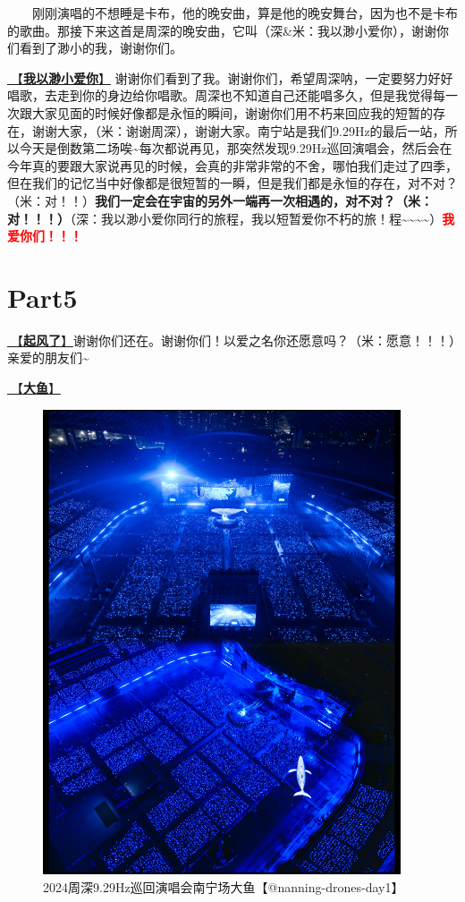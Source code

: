 \documentclass[]{ctexbook}
\begin{document}
  刚刚演唱的不想睡是卡布，他的晚安曲，算是他的晚安舞台，因为也不是卡布的歌曲。那接下来这首是周深的晚安曲，它叫（深\&米：我以渺小爱你），谢谢你们看到了渺小的我，谢谢你们。

\hyperref[loving-you-in-my-humble-way]{🎵【\textbf{我以渺小爱你}】} 谢谢你们看到了我。谢谢你们，希望周深呐，一定要努力好好唱歌，去走到你的身边给你唱歌。周深也不知道自己还能唱多久，但是我觉得每一次跟大家见面的时候好像都是永恒的瞬间，谢谢你们用不朽来回应我的短暂的存在，谢谢大家，（米：谢谢周深），谢谢大家。南宁站是我们9.29Hz的最后一站，所以今天是倒数第二场唉\textasciitilde 每次都说再见，那突然发现9.29Hz巡回演唱会，然后会在今年真的要跟大家说再见的时候，会真的非常非常的不舍，哪怕我们走过了四季，但在我们的记忆当中好像都是很短暂的一瞬，但是我们都是永恒的存在，对不对？（米：对！！）\textbf{我们一定会在宇宙的另外一端再一次相遇的，对不对？（米：对！！！）}（深：我以渺小爱你同行的旅程，我以短暂爱你不朽的旅！程\textasciitilde\textasciitilde\textasciitilde\textasciitilde）\textbf{\textcolor{red}{我爱你们！！！} }

\section{Part5}\label{nanning-20241206-part5}

\hyperref[the-wind-rises]{🎵【\textbf{起风了}】}谢谢你们还在。谢谢你们！以爱之名你还愿意吗？（米：愿意！！！）亲爱的朋友们\textasciitilde{}

\hyperref[big-fish]{🎵【\textbf{大鱼}】}

\begin{figure}

{\centering \includegraphics[width=300pt]{img/nanning20241206/004} 

}

\caption{2024周深9.29Hz巡回演唱会南宁场大鱼【@nanning-drones-day1】}\label{fig:unnamed-chunk-142}
\end{figure}
\end{document}
